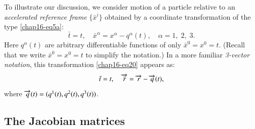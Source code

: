 To illustrate  our  discussion, we  consider motion of a particle relative to an  \textsl{accelerated reference frame} $\{\bar{x}^i\}$ obtained by  a coordinate transformation of the type \eqref{chap16-eq5a}: 
\begin{equation}
\bar{t}=t, \quad \bar{x}^\alpha =x^\alpha - q^\alpha(t), \quad \alpha=1,\;2,\;3.\label{chap16-eq20}
\end{equation} 
Here  $q^\alpha (t)$ are arbitrary differentiable functions of only $\bar{x}^0=x^0=t$. (Recall that  we write $\bar{x}^0=x^0=t$ to simplify the notation.) In a more familiar \textsl{3-vector notation}, this transformation \eqref{chap16-eq20} appears as:
\begin{equation}
\bar{t}=t, \quad  {\overrightarrow{\bar{r}}}=\overrightarrow{r} - \overrightarrow{q}(t),\label{chap16-eq21}
\end{equation}
where $\overrightarrow{q}(t)=(q^1(t),q^2(t),q^3(t))$.

\subsection{The Jacobian matrices}\label{chap16-sec6.1}


